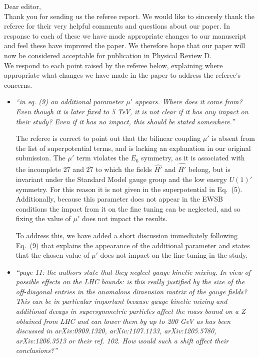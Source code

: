 \documentclass[12pt]{article}
\begin{document}
\noindent Dear editor,
\\

\noindent Thank you for sending us the referee report.  We would like to
sincerely thank the referee for their very helpful comments and questions
about our paper.  In response to each of these we have made appropriate
changes to our manuscript and feel these have improved the paper.  We
therefore hope that our paper will now be considered acceptable for
publication in Physical Review D.
\\
\noindent We respond to each point raised by the referee below, explaining
where appropriate what changes we have made in the paper to address the
referee's concerns.

\begin{itemize}
\item {\it ``in eq. (9) an additional parameter $\mu'$ appears.  Where
does it come from?  Even though it is later fixed to 5 TeV, it is not
clear if it has any impact on their study?  Even if it has no impact,
this should be stated somewhere.''}

The referee is correct to point out that the bilinear coupling $\mu'$ is
absent from the list of superpotential terms, and is lacking an explanation
in our original submission. The $\mu'$ term violates the $E_6$ symmetry, as
it is associated with the incomplete $27$ and $\overline{27}$ to which the
fields $\hat{H'}$ and $\hat{\overline{H}'}$ belong, but is invariant under
the Standard Model gauge group and the low energy $U(1)'$ symmetry. For this
reason it is not given in the superpotential in Eq.~(5). Additionally, because
this parameter does not appear in the EWSB conditions the impact from it on
the fine tuning can be neglected, and so fixing the value of $\mu'$ does not
impact the results.

To address this, we have added a short discussion immediately
following Eq.~(9) that explains the appearance of the additional parameter
and states that the chosen value of $\mu'$ does not impact on the fine
tuning in the study.

\item {\it ``page 11: the authors state that they neglect gauge kinetic
mixing.  In view of possible effects on the LHC bounds: is this really
justified by the size of the off-diagonal entries in the anomalous
dimension matrix of the gauge fields?  This can be in particular important
because gauge kinetic mixing and additional decays in supersymmetric
particles affect the mass bound on a Z obtained from LHC and can lower them
by up to 200 GeV as has been discussed in arXiv:0909.1320, arXiv:1107.1133,
arXiv:1205.5780, arXiv:1206.3513 or their ref. 102.  How would such a shift
affect their conclusions?''}


\end{itemize}
\end{document}
